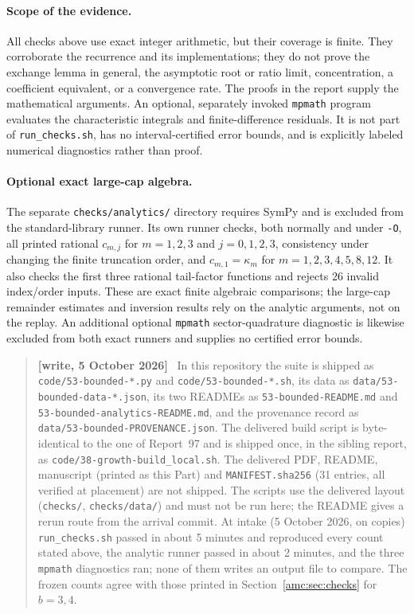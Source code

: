 \documentclass[11pt,letterpaper]{article}
\theoremstyle{remark}\newtheorem{remark}[theorem]{Remark}
\newenvironment{writenotedated}[1]{\par\smallskip\begin{quote}\small\textbf{[write, #1]}\ }{\end{quote}\smallskip}
\newcommand{\repopath}[1]{\nolinkurl{#1}}
\begin{document}
\paragraph{Scope of the evidence.}
All checks above use exact integer arithmetic, but their coverage is finite.
They corroborate the recurrence and its implementations; they do not prove
the exchange lemma in general, the asymptotic root or ratio limit,
concentration, a coefficient equivalent, or a convergence rate.  The proofs
in the report supply the mathematical arguments.
An optional, separately invoked \texttt{mpmath} program evaluates the
characteristic integrals and finite-difference residuals.  It is not part of
\texttt{run\_checks.sh}, has no interval-certified error bounds, and is
explicitly labeled numerical diagnostics rather than proof.

\paragraph{Optional exact large-cap algebra.}
The separate \texttt{checks/analytics/} directory requires SymPy and is excluded
from the standard-library runner.  Its own runner checks, both normally and
under \texttt{-O}, all printed rational $c_{m,j}$ for $m=1,2,3$ and
$j=0,1,2,3$, consistency under changing the finite truncation order, and
$c_{m,1}=\kappa_m$ for $m=1,2,3,4,5,8,12$.  It also checks the first three
rational tail-factor functions and rejects 26 invalid index/order inputs.
These are exact finite algebraic comparisons; the large-cap remainder estimates
and inversion results rely on the analytic arguments, not on the replay.
An additional optional \texttt{mpmath} sector-quadrature diagnostic is likewise
excluded from both exact runners and supplies no certified error bounds.

\begin{writenotedated}{5 October 2026}
In this repository the suite is shipped as \repopath{code/53-bounded-*.py} and \repopath{code/53-bounded-*.sh}, its data as \repopath{data/53-bounded-data-*.json}, its two READMEs as \repopath{53-bounded-README.md} and \repopath{53-bounded-analytics-README.md}, and the provenance record as \repopath{data/53-bounded-PROVENANCE.json}. The delivered build script is byte-identical to the one of Report~97 and is shipped once, in the sibling report, as \repopath{code/38-growth-build_local.sh}. The delivered PDF, README, manuscript (printed as this Part) and \texttt{MANIFEST.sha256} (31 entries, all verified at placement) are not shipped. The scripts use the delivered layout (\texttt{checks/}, \texttt{checks/data/}) and must not be run here; the README gives a rerun route from the arrival commit. At intake (5 October 2026, on copies) \texttt{run\_checks.sh} passed in about 5 minutes and reproduced every count stated above, the analytic runner passed in about 2 minutes, and the three \texttt{mpmath} diagnostics ran; none of them writes an output file to compare. The frozen counts agree with those printed in Section~\ref{amc:sec:checks} for $b=3,4$.
\end{writenotedated}
\end{document}
